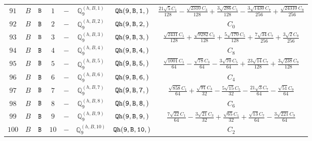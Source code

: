 \documentclass[fleqn,8pt]{jsarticle}
\begin{document}
\begin{table}[ht!]
\begin{center}
\begin{tabular}{cccccccc}
$ 91 $ & $ B $ & $ {\tt B} $ & $ 1 $ & $ - $ & $ \mathbb{Q}_{9}^{(h,B,1)} $ & $ {\tt Qh(9,B,1,)} $ & $ \frac{21 \sqrt{5} C_{1}}{128} - \frac{\sqrt{2310} C_{3}}{128} + \frac{3 \sqrt{286} C_{5}}{128} - \frac{3 \sqrt{1430} C_{7}}{256} + \frac{\sqrt{24310} C_{9}}{256} $ \\
$ 92 $ & $ B $ & $ {\tt B} $ & $ 2 $ & $ - $ & $ \mathbb{Q}_{9}^{(h,B,2)} $ & $ {\tt Qh(9,B,2,)} $ & $ C_{0} $ \\
$ 93 $ & $ B $ & $ {\tt B} $ & $ 3 $ & $ - $ & $ \mathbb{Q}_{9}^{(h,B,3)} $ & $ {\tt Qh(9,B,3,)} $ & $ \frac{\sqrt{2431} C_{1}}{128} + \frac{\sqrt{9282} C_{3}}{128} + \frac{5 \sqrt{170} C_{5}}{128} + \frac{7 \sqrt{34} C_{7}}{256} + \frac{3 \sqrt{2} C_{9}}{256} $ \\
$ 94 $ & $ B $ & $ {\tt B} $ & $ 4 $ & $ - $ & $ \mathbb{Q}_{9}^{(h,B,4)} $ & $ {\tt Qh(9,B,4,)} $ & $ C_{8} $ \\
$ 95 $ & $ B $ & $ {\tt B} $ & $ 5 $ & $ - $ & $ \mathbb{Q}_{9}^{(h,B,5)} $ & $ {\tt Qh(9,B,5,)} $ & $ \frac{\sqrt{1001} C_{1}}{64} - \frac{\sqrt{78} C_{3}}{64} - \frac{3 \sqrt{70} C_{5}}{64} + \frac{23 \sqrt{14} C_{7}}{128} + \frac{3 \sqrt{238} C_{9}}{128} $ \\
$ 96 $ & $ B $ & $ {\tt B} $ & $ 6 $ & $ - $ & $ \mathbb{Q}_{9}^{(h,B,6)} $ & $ {\tt Qh(9,B,6,)} $ & $ C_{4} $ \\
$ 97 $ & $ B $ & $ {\tt B} $ & $ 7 $ & $ - $ & $ \mathbb{Q}_{9}^{(h,B,7)} $ & $ {\tt Qh(9,B,7,)} $ & $ \frac{\sqrt{858} C_{1}}{64} + \frac{\sqrt{91} C_{3}}{32} - \frac{5 \sqrt{15} C_{5}}{32} - \frac{21 \sqrt{3} C_{7}}{64} - \frac{\sqrt{51} C_{9}}{64} $ \\
$ 98 $ & $ B $ & $ {\tt B} $ & $ 8 $ & $ - $ & $ \mathbb{Q}_{9}^{(h,B,8)} $ & $ {\tt Qh(9,B,8,)} $ & $ C_{6} $ \\
$ 99 $ & $ B $ & $ {\tt B} $ & $ 9 $ & $ - $ & $ \mathbb{Q}_{9}^{(h,B,9)} $ & $ {\tt Qh(9,B,9,)} $ & $ \frac{7 \sqrt{22} C_{1}}{64} - \frac{3 \sqrt{21} C_{3}}{32} + \frac{\sqrt{65} C_{5}}{32} + \frac{\sqrt{13} C_{7}}{64} - \frac{3 \sqrt{221} C_{9}}{64} $ \\
$ 100 $ & $ B $ & $ {\tt B} $ & $ 10 $ & $ - $ & $ \mathbb{Q}_{9}^{(h,B,10)} $ & $ {\tt Qh(9,B,10,)} $ & $ C_{2} $ \\
 \hline \hline
\end{tabular}
\end{center}
\end{table}
\end{document}
